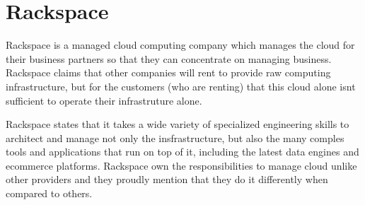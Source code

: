 \section{Rackspace}
Rackspace is a managed cloud computing company which manages the cloud for their
business partners so that they can concentrate on managing business. Rackspace
claims that other companies will rent to provide raw computing infrastructure,
but for the customers (who are renting) that this cloud alone isnt sufficient to
operate their infrastruture alone.

Rackspace states that it takes a wide variety of specialized engineering skills
to architect and manage not only the insfrastructure, but also the many comples
tools and applications that run on top of it, including the latest data engines
and ecommerce platforms. Rackspace own the responsibilities to manage cloud
unlike other providers and they proudly mention that they do it differently when
compared to others. \cite{Owncloud}

 